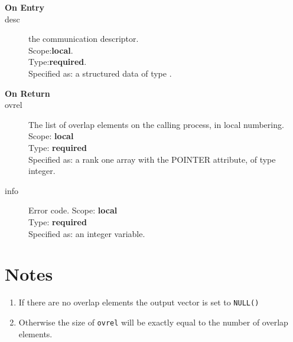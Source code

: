 

\begin{description}
\item[\bf On Entry]
\item[desc] the communication descriptor.\\
Scope:{\bf local}.\\
Type:{\bf required}.\\
Specified as: a structured data of type \descdata.
\end{description}

\begin{description}
\item[\bf On Return]
\item[ovrel] The list of overlap elements on the calling process, in
  local numbering.\\
Scope: {\bf local} \\
Type: {\bf required}\\
Specified as: a rank one array with the POINTER
attribute, of type integer.\\
\item[info] Error code.
Scope: {\bf local} \\
Type: {\bf required}\\
Specified as: an integer variable.
\end{description}

\section*{Notes}
\begin{enumerate}
\item If there are no overlap elements the output vector is set
  to \verb|NULL()|
\item Otherwise the size of \verb|ovrel| will be exactly equal to the
  number of overlap elements. 
\end{enumerate}




